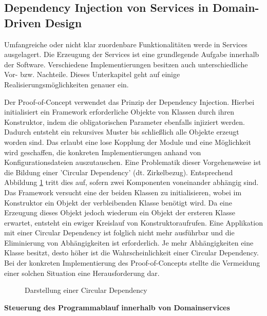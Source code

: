 \subsection{Dependency Injection von Services in Domain-Driven Design}

Umfangreiche oder nicht klar zuordenbare Funktionalitäten werde in Services ausgelagert. Die Erzeugung der Services ist eine grundlegende Aufgabe innerhalb der Software. Verschiedene Implementierungen besitzen auch unterschiedliche Vor- bzw. Nachteile. Dieses Unterkapitel geht auf einige Realisierungsmöglichkeiten genauer ein. 

Der Proof-of-Concept verwendet das Prinzip der Dependency Injection. Hierbei initialisiert ein Framework erforderliche Objekte von Klassen durch ihren Konstruktor, indem die obligatorischen Parameter ebenfalls injiziert werden. Dadurch entsteht ein rekursives Muster bis schließlich alle Objekte erzeugt worden sind. Das erlaubt eine lose Kopplung der Module und eine Möglichkeit wird geschaffen, die konkreten Implementierungen anhand von Konfigurationsdateien auszutauschen. Eine Problematik dieser Vorgehensweise ist die Bildung einer 'Circular Dependency' (dt. Zirkelbezug). Entsprechend Abbildung \ref{fig:circulardependency} tritt dies auf, sofern zwei Komponenten voneinander abhängig sind. Das Framework versucht eine der beiden Klassen zu initialisieren, wobei im Konstruktor ein Objekt der verbleibenden Klasse benötigt wird. Da eine Erzeugung dieses Objekt jedoch wiederum ein Objekt der ersteren Klasse erwartet, entsteht ein ewiger Kreislauf von Konstruktoraufrufen. Eine Applikation mit einer Circular Dependency ist folglich nicht mehr ausführbar und die Eliminierung von Abhängigkeiten ist erforderlich. Je mehr Abhängigkeiten eine Klasse besitzt, desto höher ist die Wahrscheinlichkeit einer Circular Dependency. Bei der konkreten Implementierung des Proof-of-Concepts stellte die Vermeidung einer solchen Situation eine Herausforderung dar. \cite[S. 93ff.]{Suryanarayana.2015}

\begin{figure}[htbp]
	\centering
	\footnotesize
	
	\caption{Darstellung einer Circular Dependency}
	\label{fig:circulardependency}
\end{figure}


\textbf{Steuerung des Programmablauf innerhalb von Domainservices}

